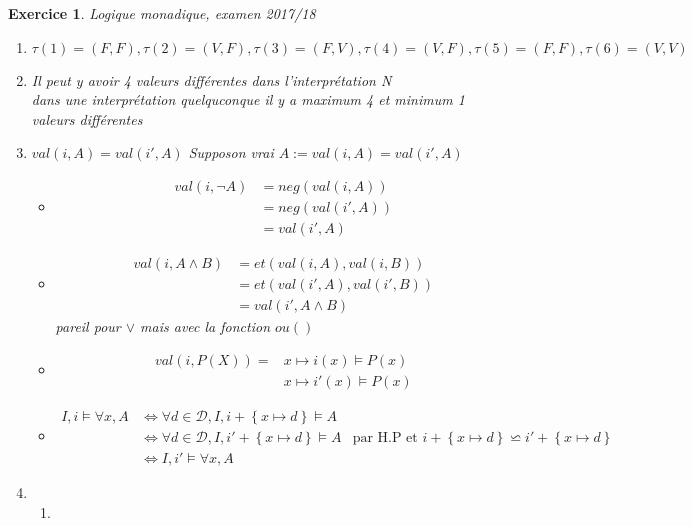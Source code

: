 \documentclass{article}
\theoremstyle{plain}
\newtheorem{exo}{Exercice}%
\begin{document}
\begin{exo} Logique monadique, examen 2017/18

\begin{enumerate}
\item $\tau (1) = (F, F), \tau (2) = (V, F), \tau (3) = (F, V)
    , \tau (4) = (V, F), \tau (5) = (F, F), \tau (6) = (V, V)$

\item Il peut y avoir 4 valeurs différentes dans l'interprétation N \\
    dans une interprétation quelquconque 
    il y a maximum 4 et minimum 1 valeurs différentes

\item $val(i, A) = val(i', A)$
    Supposon vrai $A := val(i, A) = val(i', A)$
    \begin{itemize}      
    \item \begin{align*}
        val(i, \neg A) &= neg(val(i, A)) \\
                        &= neg(val(i', A)) \\
                        &= val(i', A)
        \end{align*}
    \item \begin{align*}
        val(i, A \wedge B) &= et(val(i, A), val(i, B)) \\
                        &= et(val(i', A), val(i', B)) \\
                        &= val(i', A \wedge B)
        \end{align*} pareil pour $\vee$ mais avec la fonction $ou()$
    \item \begin{align*}
        val(i, P(X)) = & x \mapsto i(x) \vDash P(x) \\
                       &  x \mapsto i'(x) \vDash P(x)
        \end{align*}
    
    \item \begin{align*}
        I, i \vDash \forall x, A &\Leftrightarrow \forall d \in \mathcal{D}, I, i + \left\{x \mapsto d \right\} \vDash A \\
                                & \Leftrightarrow \forall d \in \mathcal{D}, I, i' + \left\{x \mapsto d \right\} \vDash A 
                                    & \text{par H.P et } i + \left\{x \mapsto d \right\} \backsimeq i' + \left\{x \mapsto d \right\} \\
                                &\Leftrightarrow I, i' \vDash \forall x, A
        \end{align*}
    \end{itemize}

\item \begin{enumerate}
    \item 
\end{enumerate}
\end{enumerate}
\end{exo}
\end{document}
